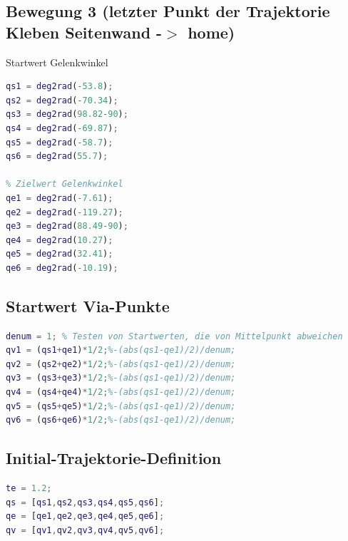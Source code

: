 \subsection{Bewegung 3 (letzter Punkt der Trajektorie Kleben Seitenwand -\ensuremath{>} home)}
%
\begin{par}
	Startwert Gelenkwinkel
\end{par} \vspace{1em}
\begin{lstlisting}[language=Matlab, numbers=none]
qs1 = deg2rad(-53.8);
qs2 = deg2rad(-70.34);
qs3 = deg2rad(98.82-90);
qs4 = deg2rad(-69.87);
qs5 = deg2rad(-58.7);
qs6 = deg2rad(55.7);

% Zielwert Gelenkwinkel
qe1 = deg2rad(-7.61);
qe2 = deg2rad(-119.27);
qe3 = deg2rad(88.49-90);
qe4 = deg2rad(10.27);
qe5 = deg2rad(32.41);
qe6 = deg2rad(-10.19);
\end{lstlisting}
%
\subsection{Startwert Via-Punkte}
%
\begin{lstlisting}[language=Matlab, numbers=none]
denum = 1; % Testen von Startwerten, die von Mittelpunkt abweichen
qv1 = (qs1+qe1)*1/2;%-(abs(qs1-qe1)/2)/denum;
qv2 = (qs2+qe2)*1/2;%-(abs(qs1-qe1)/2)/denum;
qv3 = (qs3+qe3)*1/2;%-(abs(qs1-qe1)/2)/denum;
qv4 = (qs4+qe4)*1/2;%-(abs(qs1-qe1)/2)/denum;
qv5 = (qs5+qe5)*1/2;%-(abs(qs1-qe1)/2)/denum;
qv6 = (qs6+qe6)*1/2;%-(abs(qs1-qe1)/2)/denum;
\end{lstlisting}
%
\subsection{Initial-Trajektorie-Definition}
%
\begin{lstlisting}[language=Matlab, numbers=none]
te = 1.2;
qs = [qs1,qs2,qs3,qs4,qs5,qs6];
qe = [qe1,qe2,qe3,qe4,qe5,qe6];
qv = [qv1,qv2,qv3,qv4,qv5,qv6];
\end{lstlisting}
%
